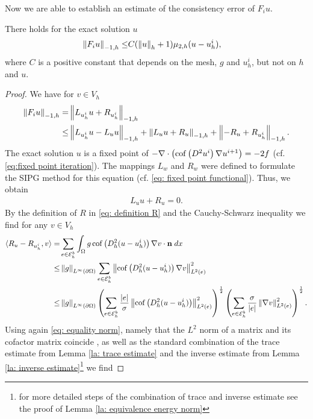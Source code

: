 Now we are able to establish an estimate of the consistency error of $F_i u$.
\begin{theorem} \label{la: consistency error F}
	There holds for the exact solution $u$
	\begin{align*}
	\left\lVert F_i u \right\rVert_{-1,h} \leq& C (\left\lVert u \right\rVert_{h}+1)\mu_{2,h}(u-u_h^i),
	\end{align*}
	where $C$ is a positive constant that depends on the mesh, $g$ and $u^i_h$, but not on $h$ and $u$. 
\end{theorem}
\begin{proof}
	We have for $v \in V_h$
	\begin{align}
	\left\lVert F_i u \right\rVert_{-1,h} =& \left\lVert  L_{u^i_h}u + R_{u^i_h} \right\rVert_{-1,h} \nonumber\\
	\leq& \left\lVert  L_{u^i_h}u - L_u u \right\rVert_{-1,h} + \left\lVert  L_{u}u + R_u \right\rVert_{-1,h} + \left\lVert  -R_u + R_{u^i_h} \right\rVert_{-1,h}. \label{eq: Fu first estimate}
	\end{align}	
	The exact solution $u$ is a fixed point of $- \nabla \cdot \left( \operatorname{cof} \left(  D^2 u^i \right) \nabla u^{i+1} \right)  = -2f$ (cf. \eqref{eq:fixed point iteration}). The mappings $L_w$ and $R_w$ were defined to formulate the SIPG method for this equation (cf. \eqref{eq: fixed point functional}). Thus, we obtain
	\begin{align}
	L_{u} u + R_u = 0. \label{eq: right solution L+U}
	\end{align}
	By the definition of $R$ in \eqref{eq: definition R} and the Cauchy-Schwarz inequality we find for any $v \in V_h$ 
	\begin{align}
	 \langle R_u - R_{u^i_h}, v \rangle 
	=& \sum_{e \in \mathcal{E}_h^b} \int_{\Omega} {{g \operatorname{cof} \left( D_h^2 (u-u_h^i) \right) \nabla v \cdot \mathbf n }\;dx}\nonumber \\
	\leq& \left\lVert g \right\rVert_{L^\infty(\partial \Omega)}
		\sum_{e \in \mathcal{E}_h^b} \left\lVert  \operatorname{cof} \left( D_h^2 (u-u_h^i) \right) \nabla v  \right\rVert_{L^2(e)}^2 \nonumber \\
	\leq& \left\lVert g \right\rVert_{L^\infty(\partial \Omega)}
		\left( \sum_{e \in \mathcal{E}_h^b} \frac {|e|} \sigma \left\lVert  \operatorname{cof} \left( D_h^2 (u-u_h^i) \right) \right\rVert_{L^2(e)}^2  \right)^{\frac 1 2}
		\left( \sum_{e \in \mathcal{E}_h^b} \frac \sigma {|e|} \left\lVert \nabla v  \right\rVert_{L^2(e)}^2  \right)^{\frac 1 2}. \label{eq: R first estimate}
	\end{align}
	Using again \eqref{eq: equality norm}, namely that the $L^2$ norm of a matrix and its cofactor matrix coincide , as well as the standard combination of the trace estimate from Lemma \ref{la: trace estimate} and the inverse estimate from Lemma \ref{la: inverse estimate}\footnote{for more detailed steps of the combination of trace and inverse estimate see the proof of Lemma \ref{la: equivalence energy norm}} we find

\end{proof}
